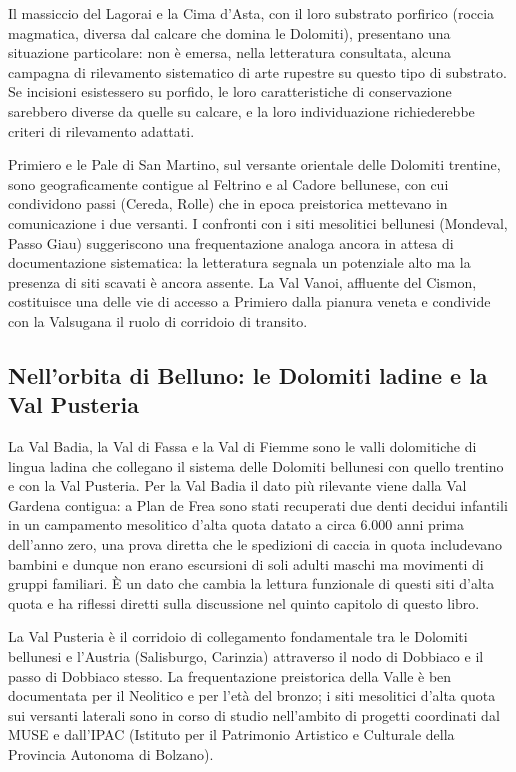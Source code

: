Il massiccio del Lagorai e la Cima d'Asta, con il loro substrato porfirico (roccia magmatica, diversa dal calcare che domina le Dolomiti), presentano una situazione particolare: non è emersa, nella letteratura consultata, alcuna campagna di rilevamento sistematico di arte rupestre su questo tipo di substrato. Se incisioni esistessero su porfido, le loro caratteristiche di conservazione sarebbero diverse da quelle su calcare, e la loro individuazione richiederebbe criteri di rilevamento adattati.

Primiero e le Pale di San Martino, sul versante orientale delle Dolomiti trentine, sono geograficamente contigue al Feltrino e al Cadore bellunese, con cui condividono passi (Cereda, Rolle) che in epoca preistorica mettevano in comunicazione i due versanti. I confronti con i siti mesolitici bellunesi (Mondeval, Passo Giau) suggeriscono una frequentazione analoga ancora in attesa di documentazione sistematica: la letteratura segnala un potenziale alto ma la presenza di siti scavati è ancora assente. La Val Vanoi, affluente del Cismon, costituisce una delle vie di accesso a Primiero dalla pianura veneta e condivide con la Valsugana il ruolo di corridoio di transito.

\subsection{Nell'orbita di Belluno: le Dolomiti ladine e la Val Pusteria}

La Val Badia, la Val di Fassa e la Val di Fiemme sono le valli dolomitiche di lingua ladina che collegano il sistema delle Dolomiti bellunesi con quello trentino e con la Val Pusteria. Per la Val Badia il dato più rilevante viene dalla Val Gardena contigua: a Plan de Frea sono stati recuperati due denti decidui infantili in un campamento mesolitico d'alta quota datato a circa 6.000 anni prima dell'anno zero, una prova diretta che le spedizioni di caccia in quota includevano bambini e dunque non erano escursioni di soli adulti maschi ma movimenti di gruppi familiari. È un dato che cambia la lettura funzionale di questi siti d'alta quota e ha riflessi diretti sulla discussione nel quinto capitolo di questo libro.

La Val Pusteria è il corridoio di collegamento fondamentale tra le Dolomiti bellunesi e l'Austria (Salisburgo, Carinzia) attraverso il nodo di Dobbiaco e il passo di Dobbiaco stesso. La frequentazione preistorica della Valle è ben documentata per il Neolitico e per l'età del bronzo; i siti mesolitici d'alta quota sui versanti laterali sono in corso di studio nell'ambito di progetti coordinati dal MUSE e dall'IPAC (Istituto per il Patrimonio Artistico e Culturale della Provincia Autonoma di Bolzano).


